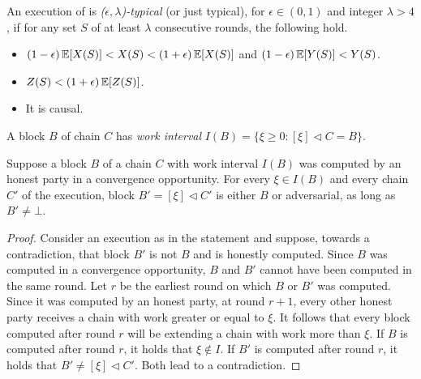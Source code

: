 \begin{definition}
  An execution of \poem is \emph{($\epsilon,\lambda$)-typical} (or just typical),
  for $\epsilon \in (0,1)$ and integer $\lambda > 4$, if for any set $S$ of at
  least $\lambda$ consecutive rounds, the following hold.
  \begin{itemize}
    \item $(1 - \epsilon) \mathop{{}\mathbb{E}}[X(S)] < X(S) < (1 + \epsilon) \mathop{{}\mathbb{E}}[X(S)]$ and $(1-\epsilon) \mathop{{}\mathbb{E}}[Y(S)] < Y(S)$.
    \item $Z(S) < (1 + \epsilon)\mathop{{}\mathbb{E}}[Z(S)]$.
    \item It is causal.
  \end{itemize}
\end{definition}

\begin{definition}
  A block $B$ of chain $C$ has \emph{work interval}
  $I(B) = \{\xi \geq 0: [\xi] \lhd C = B\}$.
\end{definition}


\begin{lemma} \label{lem:pairing}
  Suppose a block $B$ of a chain $C$ with work interval $I(B)$
  was computed by an honest party in a convergence opportunity.
  For every $\xi \in I(B)$ and every chain $C'$ of the execution,
  block $B' = [\xi] \lhd C'$ is either $B$ or adversarial,
  as long as $B' \neq \bot$.
\end{lemma}
\begin{proof}
  Consider an execution as in the statement and suppose, towards a contradiction,
  that block $B'$ is not $B$ and is honestly computed.
  Since $B$ was computed in a convergence opportunity, $B$ and $B'$
  cannot have been computed in the same round. Let $r$ be the earliest round
  on which $B$ or $B'$ was computed. Since it was computed by
  an honest party, at round $r + 1$, every other honest party receives
  a chain with work greater or equal to $\xi$.
  It follows that every block computed
  after round $r$ will be extending a chain with work more than $\xi$.
  If $B$ is computed after round $r$, it holds that $\xi \not \in I$.
  If $B'$ is computed after round $r$, it holds that $B' \neq [\xi] \lhd C'$.
  Both lead to a contradiction. \Qed
\end{proof}

